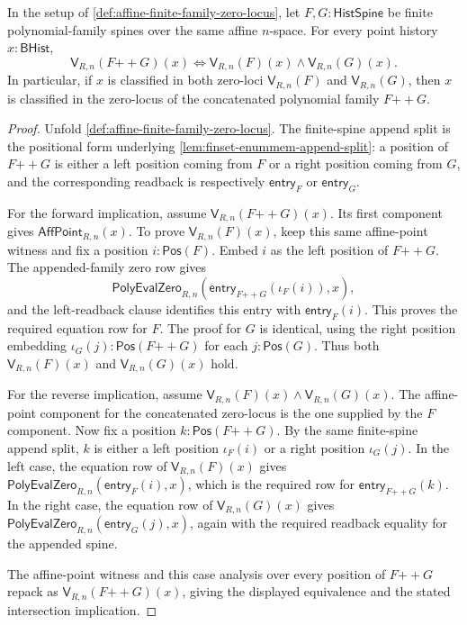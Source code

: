\begin{theorem}
\label{thm:affine-zero-locus-intersection-equation-concatenation}
In the setup of \autoref{def:affine-finite-family-zero-locus}, let $F,G:\mathsf{HistSpine}$ be finite polynomial-family spines over the same affine $n$-space. For every point history $x:\mathsf{BHist}$,
$$
\mathsf{V}_{R,n}(F{++}G)(x)
\Longleftrightarrow
\mathsf{V}_{R,n}(F)(x)\land\mathsf{V}_{R,n}(G)(x).
$$
In particular, if $x$ is classified in both zero-loci $\mathsf{V}_{R,n}(F)$ and $\mathsf{V}_{R,n}(G)$, then $x$ is classified in the zero-locus of the concatenated polynomial family $F{++}G$.
\end{theorem}
\begin{proof}
Unfold \autoref{def:affine-finite-family-zero-locus}. The finite-spine append split is the positional form underlying \autoref{lem:finset-enummem-append-split}: a position of $F{++}G$ is either a left position coming from $F$ or a right position coming from $G$, and the corresponding readback is respectively $\mathsf{entry}_{F}$ or $\mathsf{entry}_{G}$.

For the forward implication, assume $\mathsf{V}_{R,n}(F{++}G)(x)$. Its first component gives $\mathsf{AffPoint}_{R,n}(x)$. To prove $\mathsf{V}_{R,n}(F)(x)$, keep this same affine-point witness and fix a position $i:\mathsf{Pos}(F)$. Embed $i$ as the left position of $F{++}G$. The appended-family zero row gives
$$
\mathsf{PolyEvalZero}_{R,n}(\mathsf{entry}_{F{++}G}(\iota_F(i)),x),
$$
and the left-readback clause identifies this entry with $\mathsf{entry}_{F}(i)$. This proves the required equation row for $F$. The proof for $G$ is identical, using the right position embedding $\iota_G(j):\mathsf{Pos}(F{++}G)$ for each $j:\mathsf{Pos}(G)$. Thus both $\mathsf{V}_{R,n}(F)(x)$ and $\mathsf{V}_{R,n}(G)(x)$ hold.

For the reverse implication, assume $\mathsf{V}_{R,n}(F)(x)\land\mathsf{V}_{R,n}(G)(x)$. The affine-point component for the concatenated zero-locus is the one supplied by the $F$ component. Now fix a position $k:\mathsf{Pos}(F{++}G)$. By the same finite-spine append split, $k$ is either a left position $\iota_F(i)$ or a right position $\iota_G(j)$. In the left case, the equation row of $\mathsf{V}_{R,n}(F)(x)$ gives $\mathsf{PolyEvalZero}_{R,n}(\mathsf{entry}_{F}(i),x)$, which is the required row for $\mathsf{entry}_{F{++}G}(k)$. In the right case, the equation row of $\mathsf{V}_{R,n}(G)(x)$ gives $\mathsf{PolyEvalZero}_{R,n}(\mathsf{entry}_{G}(j),x)$, again with the required readback equality for the appended spine.

The affine-point witness and this case analysis over every position of $F{++}G$ repack as $\mathsf{V}_{R,n}(F{++}G)(x)$, giving the displayed equivalence and the stated intersection implication.
\end{proof}

